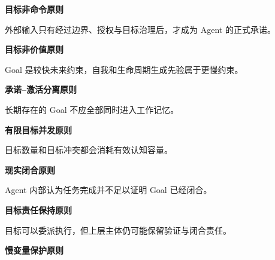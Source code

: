 \textbf{目标非命令原则}

\begin{statementbox}
\centering
{}
\end{statementbox}

外部输入只有经过边界、授权与目标治理后，才成为 Agent 的正式承诺。


\textbf{目标非价值原则}

\begin{statementbox}
\centering
{}
\end{statementbox}

Goal 是较快未来约束，自我和生命周期生成先验属于更慢约束。


\textbf{承诺--激活分离原则}

\begin{statementbox}
\centering
{}
\end{statementbox}

长期存在的 Goal 不应全部同时进入工作记忆。


\textbf{有限目标并发原则}

\begin{statementbox}
\centering
{}
\end{statementbox}

目标数量和目标冲突都会消耗有效认知容量。


\textbf{现实闭合原则}

\begin{statementbox}
\centering
{}
\end{statementbox}

Agent 内部认为任务完成并不足以证明 Goal 已经闭合。


\textbf{目标责任保持原则}

\begin{statementbox}
\centering
{}
\end{statementbox}

目标可以委派执行，但上层主体仍可能保留验证与闭合责任。


\textbf{慢变量保护原则}

